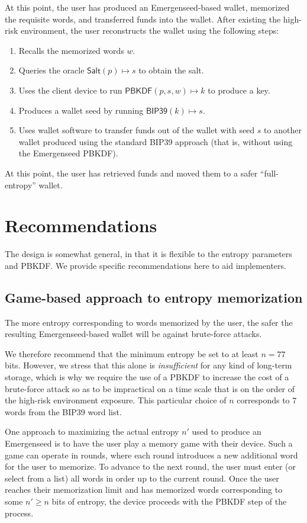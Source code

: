 \documentclass{article}
\begin{document}
At this point, the user has produced an Emergenseed-based wallet, memorized the requisite words, and transferred funds into the wallet.
After existing the high-risk environment, the user reconstructs the wallet using the following steps:
\begin{enumerate}
	\item Recalls the memorized words $w$.
	\item Queries the oracle $\mathsf{Salt}(p) \mapsto s$ to obtain the salt.
	\item Uses the client device to run $\mathsf{PBKDF}(p, s, w) \mapsto k$ to produce a key.
	\item Produces a wallet seed by running $\mathsf{BIP39}(k) \mapsto s$.
	\item Uses wallet software to transfer funds out of the wallet with seed $s$ to another wallet produced using the standard BIP39 approach (that is, without using the Emergenseed PBKDF).
\end{enumerate}

At this point, the user has retrieved funds and moved them to a safer ``full-entropy'' wallet.


\section{Recommendations}

The design is somewhat general, in that it is flexible to the entropy parameters and PBKDF.
We provide specific recommendations here to aid implementers.


\subsection{Game-based approach to entropy memorization}

The more entropy corresponding to words memorized by the user, the safer the resulting Emergenseed-based wallet will be against brute-force attacks.

We therefore recommend that the minimum entropy be set to at least $n = 77$ bits.
However, we stress that this alone is \textit{insufficient} for any kind of long-term storage, which is why we require the use of a PBKDF to increase the cost of a brute-force attack so as to be impractical on a time scale that is on the order of the high-risk environment exposure.
This particular choice of $n$ corresponds to $7$ words from the BIP39 word list.

One approach to maximizing the actual entropy $n'$ used to produce an Emergenseed is to have the user play a memory game with their device.
Such a game can operate in rounds, where each round introduces a new additional word for the user to memorize.
To advance to the next round, the user must enter (or select from a list) all words in order up to the current round.
Once the user reaches their memorization limit and has memorized words corresponding to some $n' \geq n$ bits of entropy, the device proceeds with the PBKDF step of the process.
\end{document}
